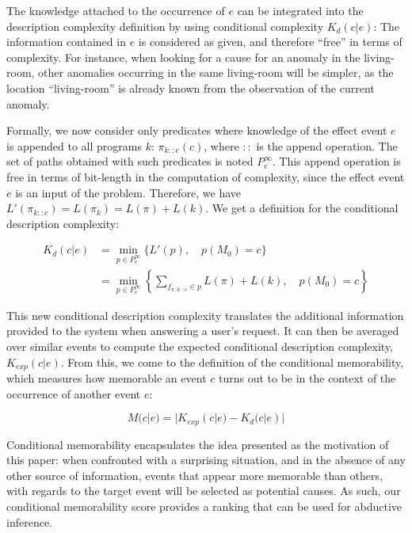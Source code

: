 \documentclass[entropy,article,submit,moreauthors,pdftex]{Definitions/mdpi}
\begin{document}
The knowledge attached to the occurrence of $e$ can be integrated into the description complexity definition by using conditional complexity $K_d(c | e)$: The information contained in $e$ is considered as given, and therefore ``free'' in terms of complexity. For instance, when looking for a cause for
an anomaly in the living-room, other anomalies occurring in the same
living-room will be simpler, as the location ``living-room'' is already known
from the observation of the current anomaly.

Formally, we now consider only predicates where knowledge of the effect event $e$  is appended to all programs $k$:
$\pi_{k::e}(c)$, where $::$ is the append operation. The set of paths obtained with such predicates is noted $P^\infty_e$. This append operation is free in terms of bit-length in the computation of complexity, since the effect event $e$ is an input of the problem. Therefore, we have $L'(\pi_{k::e}) = L(\pi_k) = L(\pi) + L(k)$. We get a definition for the conditional description complexity:

\begin{align}
    \label{eq:abd_k}
    K_d(c | e) & = \min_{p \in P^\infty_e} \{L'(p), \quad p(M_0)=c \}                                                \\
               & = \min_{p \in P^\infty_e} \left\{\sum_{f_{\pi, k::e} \in p} L(\pi) + L(k), \quad p(M_0) = c\right\}
\end{align}

This new conditional description complexity translates the additional information provided to the
system when answering a user's request. It can then be averaged over similar events to compute the expected conditional description complexity, $K_{exp}(c|e)$. From this, we come to the definition of the conditional memorability, which measures how memorable an event $c$ turns out to be in the context of the occurrence of another event $e$:

\begin{equation}
    \label{eq:cond_mem}
    M(c|e) = |K_{exp}(c|e) - K_d(c|e)|
\end{equation}

Conditional memorability encapsulates the idea
presented as the motivation of this paper: when confronted with a surprising
situation, and in the absence of any other source of information, events that appear more memorable than others, with regards to the target event will be selected as potential causes. As such, our conditional memorability score provides a ranking that can be used for abductive inference.
\end{document}
